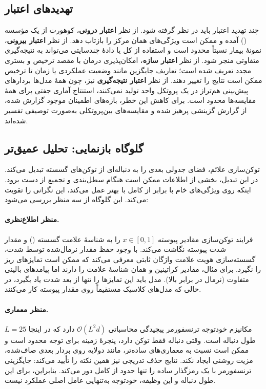 \subsection{تهدیدهای اعتبار}

چند تهدید اعتبار باید در نظر گرفته شود. از نظر \textbf{اعتبار درونی}، کوهورت از یک مؤسسه () آمده و ممکن است ویژگی‌های همان مرکز را بازتاب دهد. از نظر \textbf{اعتبار بیرونی}، نمونۀ  بیمار نسبتاً محدود است و استفاده از کل  یا دادۀ چندسایتی می‌تواند به نتیجه‌گیری متفاوتی منجر شود. از نظر \textbf{اعتبار سازه}، امکان‌پذیری درمان با مقصد ترخیص و بستری مجدد تعریف شده است؛ تعاریف جایگزین مانند وضعیت عملکردی یا زمان تا ترخیص ممکن است نتایج را تغییر دهند. از نظر \textbf{اعتبار نتیجه‌گیری} نیز، چون همۀ مدل‌ها بردارهای پیش‌بینی هم‌تراز در یک پروتکل واحد تولید نمی‌کنند، استنتاج آماری جفتی برای همۀ مقایسه‌ها محدود است. برای کاهش این خطر، بازه‌های اطمینان موجود گزارش شده، از گزارش گزینشی پرهیز شده و مقایسه‌های بین‌پروتکلی به‌صورت توصیفی تفسیر شده‌اند.

\subsection{گلوگاه بازنمایی: تحلیل عمیق‌تر}

توکن‌سازی علائم، فضای جدولی بعدی را به دنباله‌ای از توکن‌های گسسته تبدیل می‌کند. در این تبدیل، بخشی از اطلاعات ممکن است هنگام سطل‌بندی و تجمیع از دست برود. اینکه  روی ویژگی‌های خام با  برابر  از  کامل با  بهتر عمل می‌کند، این نگرانی را تقویت می‌کند. این گلوگاه از سه منظر بررسی می‌شود:

\paragraph{منظر اطلاع‌نظری.} فرایند توکن‌سازی مقادیر پیوسته $x \in [0,1]$ را به شناسۀ علامت گسسته () و مقدار شدت پیوسته نگاشت می‌کند. با وجود حفظ مقدار نرمال‌شده توسط شدت، گسسته‌سازی هویت علامت واژگان ثابتی معرفی می‌کند که ممکن است تمایزهای ریز را نگیرد. برای مثال، مقادیر کراتینین  و  همان شناسۀ علامت را دارند اما پیامدهای بالینی متفاوت (نرمال در برابر بالا). مدل باید این تمایزها را تنها از بعد شدت یاد بگیرد، در حالی که مدل‌های کلاسیک مستقیماً روی مقدار پیوسته کار می‌کنند.

\paragraph{منظر معماری.} مکانیزم خودتوجه ترنسفورمر پیچیدگی محاسباتی $\mathcal{O}(L^2 d)$ دارد که در اینجا $L=25$ طول دنباله است. وقتی دنباله فقط  توکن دارد، پنجرۀ زمینه برای توجه محدود است و ممکن است نسبت به معماری‌های ساده‌تر، مانند  دولایه روی بردار بعدی صاف‌شده، مزیت روشنی ایجاد نکند. نتایج حذف تدریجی نیز همین نکته را تأیید می‌کند: جایگزینی ترنسفورمر با یک رمزگذار  ساده  را تنها حدود  از  کامل دور می‌کند. بنابراین، برای این طول دنباله و این وظیفه، خودتوجه به‌تنهایی عامل اصلی عملکرد نیست.

